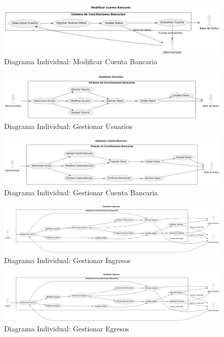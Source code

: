 \documentclass{article}
\begin{document}
\begin{figure}[H]
    \centering
    \includegraphics[width=\textwidth]{casos/ModificarCuentaBancaria.png}
    \caption{Diagrama Individual: Modificar Cuenta Bancaria}
\end{figure}

\begin{figure}[H]
    \centering
    \includegraphics[width=\textwidth]{casos/GestionarUsuarios.png}
    \caption{Diagrama Individual: Gestionar Usuarios}
\end{figure}

\begin{figure}[H]
    \centering
    \includegraphics[width=\textwidth]{casos/GestionarCuentaBancaria.png}
    \caption{Diagrama Individual: Gestionar Cuenta Bancaria}
\end{figure}

\begin{figure}[H]
    \centering
    \includegraphics[width=\textwidth]{casos/GestionarIngresos.png}
    \caption{Diagrama Individual: Gestionar Ingresos}
\end{figure}

\begin{figure}[H]
    \centering
    \includegraphics[width=\textwidth]{casos/GestionarEgresos.png}
    \caption{Diagrama Individual: Gestionar Egresos}
\end{figure}
\end{document}
